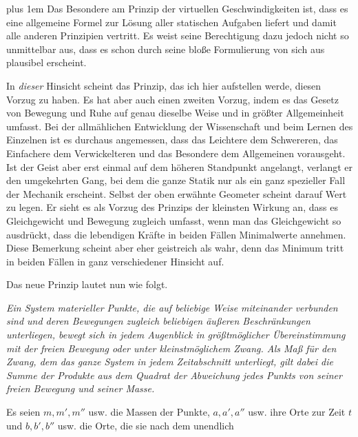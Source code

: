 \par{}
{\rightskip=0pt plus 1em Das Besondere am Prinzip der virtuellen Geschwindigkeiten ist, dass es eine allgemeine Formel zur Lösung aller statischen Aufgaben liefert und damit alle anderen Prinzipien vertritt. Es weist seine Berechtigung dazu jedoch nicht so unmittelbar aus, dass es schon durch seine bloße Formulierung von sich aus plausibel erscheint.\par}

In \textit{dieser} Hinsicht scheint das Prinzip, das ich hier aufstellen werde, diesen Vorzug zu haben. Es hat aber auch einen zweiten Vorzug, indem es das Gesetz von Bewegung und Ruhe auf genau dieselbe Weise und in größter Allgemeinheit umfasst. Bei der allmählichen Entwicklung der Wissenschaft und beim Lernen des Einzelnen ist es durchaus angemessen, dass das Leichtere dem Schwereren, das Einfachere dem Verwickelteren und das Besondere dem Allgemeinen vorausgeht. Ist der Geist aber erst einmal auf dem höheren Standpunkt angelangt, verlangt er den umgekehrten Gang, bei dem die ganze Statik nur als ein ganz spezieller Fall der Mechanik erscheint. Selbst der oben erwähnte Geometer scheint darauf Wert zu legen. Er sieht es als Vorzug des Prinzips der kleinsten Wirkung an, dass es Gleichgewicht und Bewegung zugleich umfasst, wenn man das Gleichgewicht so ausdrückt, dass die lebendigen Kräfte in beiden Fällen Minimalwerte annehmen. Diese Bemerkung scheint aber eher geistreich als wahr, denn das Minimum tritt in beiden Fällen in ganz verschiedener Hinsicht auf.

Das neue Prinzip lautet nun wie folgt.

\textit{Ein System materieller Punkte, die auf beliebige Weise miteinander verbunden sind und deren Bewegungen zugleich beliebigen äußeren Beschränkungen unterliegen, bewegt sich in jedem Augenblick in größtmöglicher Übereinstimmung mit der freien Bewegung oder unter kleinstmöglichem Zwang. Als Maß für den Zwang, dem das ganze System in jedem Zeitabschnitt unterliegt, gilt dabei die Summe der Produkte aus dem Quadrat der Abweichung jedes Punkts von seiner freien Bewegung und seiner Masse.}

Es seien $m,m',m''$ usw. die Massen der Punkte, $a,a',a''$ usw. ihre Orte zur Zeit $t$ und $b,b',b''$ usw. die Orte, die sie nach dem unendlich
